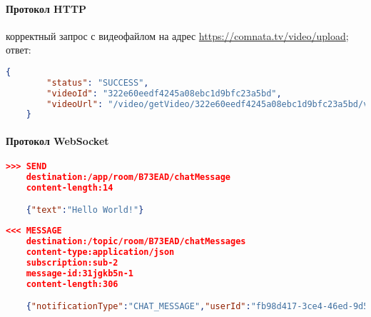 \documentclass{../includes/TechDoc}
\begin{document}
    \paragraph{Протокол HTTP}

     корректный запрос с видеофайлом на адрес \url{https://comnata.tv/video/upload};\\

     ответ:
    \begin{lstlisting}[language=json,caption={Пример ответа при работе с HTTP протоколом}]
    {
  		"status": "SUCCESS",
  		"videoId": "322e60eedf4245a08ebc1d9bfc23a5bd",
  		"videoUrl": "/video/getVideo/322e60eedf4245a08ebc1d9bfc23a5bd/video.m3u8"
	}
    \end{lstlisting}

    \paragraph{Протокол WebSocket}

    \begin{lstlisting}[language=json,caption={Пример запроса при работе с WebSocket протоколом}]
    >>> SEND
	destination:/app/room/B73EAD/chatMessage
	content-length:14

	{"text":"Hello World!"}
    \end{lstlisting}

    \begin{lstlisting}[language=json,caption={Пример ответа при работе с WebSocket протоколом}]
    <<< MESSAGE
	destination:/topic/room/B73EAD/chatMessages
	content-type:application/json
	subscription:sub-2
	message-id:31jgkb5n-1
	content-length:306

	{"notificationType":"CHAT_MESSAGE","userId":"fb98d417-3ce4-46ed-9d50-e9c8ebdcdd15","text":"Hello World!","dateTime":{"dayOfWeek":"TUESDAY","dayOfYear":131,"nano":973629000,"year":2021,"monthValue":5,"dayOfMonth":11,"hour":13,"minute":13,"second":18,"month":"MAY","chronology":{"id":"ISO","calendarType":"iso8601"}}}
    \end{lstlisting}

    \registrationList
\end{document}
